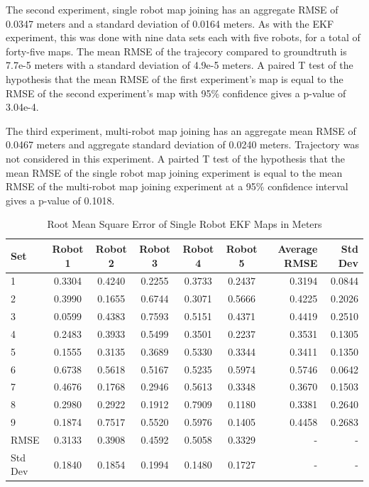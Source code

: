 \documentclass[12pt]{report}
\begin{document}
The second experiment, single robot map joining has an aggregate RMSE
of 0.0347 meters and a standard deviation of 0.0164 meters. As with
the EKF experiment, this was done with nine data sets each with five
robots, for a total of forty-five maps. The mean RMSE of the trajecory
compared to groundtruth is 7.7e-5 meters with a standard deviation of
4.9e-5 meters. A paired T test of the hypothesis that the mean RMSE of
the first experiment's map is equal to the RMSE of the second
experiment's map with 95\% confidence gives a p-value of 3.04e-4.

The third experiment, multi-robot map joining has an aggregate mean
RMSE of 0.0467 meters and aggregate standard deviation of 0.0240
meters. Trajectory was not considered in this experiment. A pairted T
test of the hypothesis that the mean RMSE of the single robot map
joining experiment is equal to the mean RMSE of the multi-robot map
joining experiment at a 95\% confidence interval gives a p-value of
0.1018.

\begin{center}
\begin{table}[h]
  \caption{Root Mean Square Error of Single Robot EKF Maps in Meters}
  \begin{tabular}{| l | c | c | c | c | c || r ||r |}
    \hline Set & Robot 1 & Robot 2 & Robot 3 & Robot 4 & Robot 5 &
    Average RMSE & Std Dev \\ \hline \hline 1 & 0.3304 & 0.4240 &
    0.2255 & 0.3733 & 0.2437 & 0.3194 & 0.0844\\ \hline 2 & 0.3990 &
    0.1655 & 0.6744 & 0.3071 & 0.5666 & 0.4225 & 0.2026\\ \hline 3 &
    0.0599 & 0.4383 & 0.7593 & 0.5151 & 0.4371 & 0.4419 &
    0.2510\\ \hline 4 & 0.2483 & 0.3933 & 0.5499 & 0.3501 & 0.2237 &
    0.3531 & 0.1305\\ \hline 5 & 0.1555 & 0.3135 & 0.3689 & 0.5330 &
    0.3344 & 0.3411 & 0.1350\\ \hline 6 & 0.6738 & 0.5618 & 0.5167 &
    0.5235 & 0.5974 & 0.5746 & 0.0642\\ \hline 7 & 0.4676 & 0.1768 &
    0.2946 & 0.5613 & 0.3348 & 0.3670 & 0.1503\\ \hline 8 & 0.2980 &
    0.2922 & 0.1912 & 0.7909 & 0.1180 & 0.3381 & 0.2640\\ \hline 9 &
    0.1874 & 0.7517 & 0.5520 & 0.5976 & 0.1405 & 0.4458 &
    0.2683\\ \hline \hline RMSE & 0.3133 & 0.3908 & 0.4592 & 0.5058 &
    0.3329 & - & -\\ \hline Std Dev & 0.1840 & 0.1854 & 0.1994 &
    0.1480 & 0.1727 & - & -\\ \hline \hline
  \end{tabular}
  \end{table}
\end{center}
\end{document}
